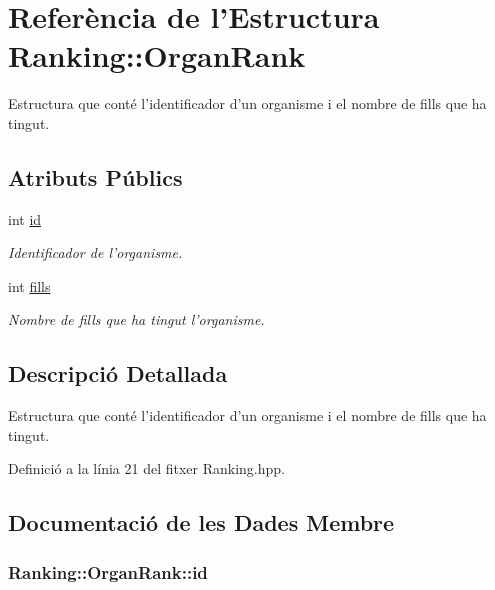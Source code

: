 \hypertarget{struct_ranking_1_1_organ_rank}{\section{Referència de l'Estructura Ranking\-:\-:Organ\-Rank}
\label{struct_ranking_1_1_organ_rank}
}


Estructura que conté l'identificador d'un organisme i el nombre de fills que ha tingut.  


\subsection*{Atributs Públics}
\begin{DoxyCompactItemize}
\item 
int \hyperlink{struct_ranking_1_1_organ_rank_ac2d4f698161d7410be2d7a9e2e96bd5f}{id}
\begin{DoxyCompactList}\small\item\em Identificador de l'organisme. \end{DoxyCompactList}\item 
int \hyperlink{struct_ranking_1_1_organ_rank_a127f9a8768fd7cfda05c3cb2f9f8cfee}{fills}
\begin{DoxyCompactList}\small\item\em Nombre de fills que ha tingut l'organisme. \end{DoxyCompactList}\end{DoxyCompactItemize}


\subsection{Descripció Detallada}
Estructura que conté l'identificador d'un organisme i el nombre de fills que ha tingut. 

Definició a la línia 21 del fitxer Ranking.\-hpp.



\subsection{Documentació de les Dades Membre}
\hypertarget{struct_ranking_1_1_organ_rank_ac2d4f698161d7410be2d7a9e2e96bd5f}{
\subsubsection[{id}]{\setlength{\rightskip}{0pt plus 5cm}Ranking\-::\-Organ\-Rank\-::id}}\label{struct_ranking_1_1_organ_rank_ac2d4f698161d7410be2d7a9e2e96bd5f}


